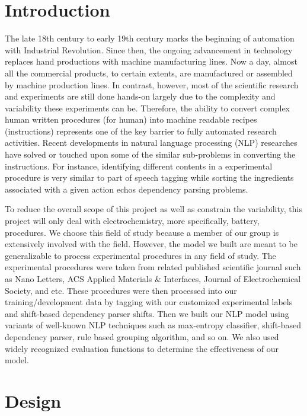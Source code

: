 \maketitle

\section{Introduction}
The late 18th century to early 19th century marks the beginning of automation with Industrial Revolution. Since then, the ongoing advancement in technology replaces hand productions with machine manufacturing lines. Now a day, almost all the commercial products, to certain extents, are manufactured or assembled by machine production lines. In contrast, however, most of the scientific research and experiments are still done hands-on largely due to the complexity and variability these experiments can be. Therefore, the ability to convert complex human written procedures (for human) into machine readable recipes (instructions) represents one of the key barrier to fully automated research activities. Recent developments in natural language processing (NLP) researches have solved or touched upon some of the similar sub-problems in converting the instructions. For instance, identifying different contents in a experimental procedure is very similar to part of speech tagging while sorting the ingredients associated with a given action echos dependency parsing problems. 

To reduce the overall scope of this project as well as constrain the variability, this project will only deal with electrochemistry, more specifically, battery, procedures. We choose this field of study because a member of our group is extensively involved with the field. However, the model we built are meant to be generalizable to process experimental procedures in any field of study. The experimental procedures were taken from related published scientific journal such as Nano Letters, ACS Applied Materials $\&$ Interfaces, Journal of Electrochemical Society, and etc. These procedures were then processed into our training/development data by tagging with our customized experimental labels and shift-based dependency parser shifts. Then we built our NLP model using variants of well-known NLP techniques such as max-entropy classifier, shift-based dependency parser, rule based grouping algorithm, and so on. We also used widely recognized evaluation functions to determine the effectiveness of our model. 

\section{Design}

